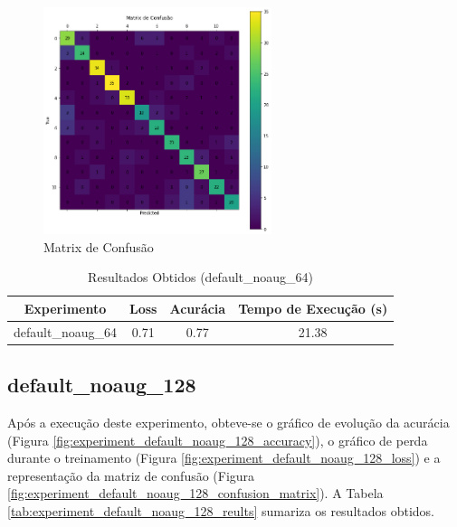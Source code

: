 \documentclass[12pt]{article}
\begin{document}
\begin{figure}[!htb]
  \centering
  \includegraphics[width=18em]{experiments/default_noaug_64/confusion_matrix.png}
  \caption{Matrix de Confusão}
  \label{fig:experiment_default_noaug_64_confusion_matrix}
\end{figure}

\begin{table}[!htb]
  \centering
  \begin{tabular}{|c|c|c|c|}
    \hline
    \textbf{Experimento} & \textbf{Loss} & \textbf{Acurácia} & \textbf{Tempo de Execução (s)} \\ \hline
    default\_noaug\_64   & 0.71          & 0.77              & 21.38                          \\ \hline
  \end{tabular}
  \caption{Resultados Obtidos (default\_noaug\_64)}
  \label{tab:experiment_default_noaug_64_reults}
\end{table}

\newpage

\subsection{default\_noaug\_128}

Após a execução deste experimento, obteve-se o gráfico de evolução da acurácia (Figura \ref{fig:experiment_default_noaug_128_accuracy}), o gráfico de perda durante o treinamento (Figura \ref{fig:experiment_default_noaug_128_loss}) e a representação da matriz de confusão (Figura \ref{fig:experiment_default_noaug_128_confusion_matrix}). A Tabela \ref{tab:experiment_default_noaug_128_reults} sumariza os resultados obtidos.
\end{document}
